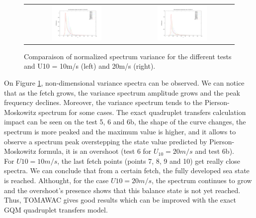 \begin{figure}[h!]
\begin{tabular}{cc}
\includegraphics[width=0.5\textwidth]{variance_ad_free_mesh_t6b_v10.pdf} & \includegraphics[width=0.5\textwidth]{variance_ad_free_mesh_t6b_v20.pdf}\\
\end{tabular}
\caption{Comparaison of normalized spectrum variance for the different tests and U10 = 10m/s (left) and 20m/s (right).}
\label{variancesfet}
\end{figure}
On Figure \ref{variancesfet}, non-dimensional variance spectra can be observed. We can notice that as the fetch grows, the variance spectrum amplitude grows and the peak frequency declines. Moreover, the variance spectrum tends to the Pierson-Moskowitz spectrum for some cases. The exact quadruplet transfers calculation impact can be seen on the test 5, 6 and 6b, the shape of the curve changes, the spectrum is more peaked and the maximum value is higher, and it allows to observe a spectrum peak overstepping the state value predicted by Pierson-Moskowitz formula, it is an overshoot (test 6 for $U_{10} = 20m/s$ and test 6b).\\
For $U10 = 10m/s$, the last fetch points (points 7, 8, 9 and 10) get really close spectra. We can conclude that from a certain fetch, the fully developed sea state is reached. Althought, for the case $U10 = 20m/s$, the spectrum continues to grow and the overshoot's presence shows that this balance state is not yet reached. Thus, TOMAWAC gives good results which can be improved with the exact GQM quadruplet transfers model.

